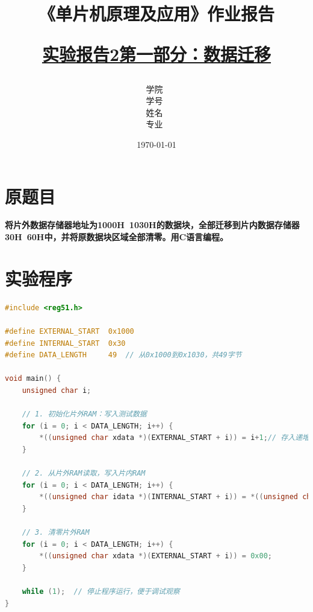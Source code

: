 \documentclass[12pt,hyperref,a4paper,UTF8]{ctexart}
\title{ 
        \vspace{1cm}
        \heiti \Huge \textbf{《单片机原理及应用》作业报告} \par
        \vspace{1cm} 
        \heiti \Large {\underline{实验报告2第一部分：数据迁移}   } 
        \vspace{3cm}
    
    }
\author{
        \vspace{0.5cm}
        \kaishu\Large 学院\ \dlmu[9cm]{卓越学院} \\ %
        \vspace{0.5cm}
        \kaishu\Large 学号\ \dlmu[9cm]{23040447} \\ %
        \vspace{0.5cm}
        \kaishu\Large 姓名\ \dlmu[9cm]{陈文轩} \qquad  \\ %
        \vspace{0.5cm}
        \kaishu\Large 专业\ \dlmu[9cm]{智能硬件与系统(电子信息工程)} \qquad \\ %
    }
\date{\today} %
\begin{document}
\cover
\thispagestyle{empty} %







\newpage
\setcounter{page}{1} %


\section{原题目}

\textbf{将片外数据存储器地址为1000H~1030H的数据块，全部迁移到片内数据存储器30H~60H中，并将原数据块区域全部清零。用C语言编程。}

\section{实验程序}
\begin{lstlisting}[language=C, caption={数据迁移实验程序}]
#include <reg51.h>

#define EXTERNAL_START  0x1000
#define INTERNAL_START  0x30
#define DATA_LENGTH     49  // 从0x1000到0x1030，共49字节

void main() {
    unsigned char i;
    
    // 1. 初始化片外RAM：写入测试数据
    for (i = 0; i < DATA_LENGTH; i++) {
        *((unsigned char xdata *)(EXTERNAL_START + i)) = i+1;// 存入递增的值
    }

    // 2. 从片外RAM读取，写入片内RAM
    for (i = 0; i < DATA_LENGTH; i++) {
        *((unsigned char idata *)(INTERNAL_START + i)) = *((unsigned char xdata *)(EXTERNAL_START + i));
    }

    // 3. 清零片外RAM
    for (i = 0; i < DATA_LENGTH; i++) {
        *((unsigned char xdata *)(EXTERNAL_START + i)) = 0x00;
    }

    while (1);  // 停止程序运行，便于调试观察
}
\end{lstlisting}
\end{document}
